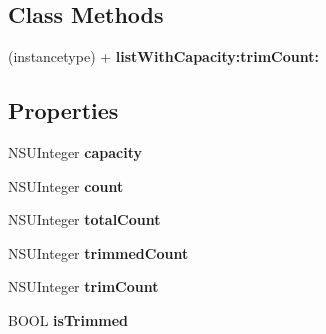 \subsection*{Class Methods}
\begin{DoxyCompactItemize}
\item 
\mbox{\label{interface_l_u_console_log_entry_list_a7004edcb9b66573dd3e6ccdc12ec0c31}} 
(instancetype) + {\bfseries list\+With\+Capacity\+:trim\+Count\+:}
\end{DoxyCompactItemize}
\subsection*{Properties}
\begin{DoxyCompactItemize}
\item 
\mbox{\label{interface_l_u_console_log_entry_list_a08451ca9ca7ccf77d938a5ba81aedc17}} 
N\+S\+U\+Integer {\bfseries capacity}
\item 
\mbox{\label{interface_l_u_console_log_entry_list_a6cc87eb37a5105a719c79ae15bb7cdb8}} 
N\+S\+U\+Integer {\bfseries count}
\item 
\mbox{\label{interface_l_u_console_log_entry_list_af4eeee1c8baef9e856969b6fb7f2d041}} 
N\+S\+U\+Integer {\bfseries total\+Count}
\item 
\mbox{\label{interface_l_u_console_log_entry_list_a64dd4adb87992e04d77aa3a9a6341b98}} 
N\+S\+U\+Integer {\bfseries trimmed\+Count}
\item 
\mbox{\label{interface_l_u_console_log_entry_list_a5ba45295bc04e5a53d8a50361faeb114}} 
N\+S\+U\+Integer {\bfseries trim\+Count}
\item 
\mbox{\label{interface_l_u_console_log_entry_list_a94b78e8b4bec82c2a7ca40c41a97bbef}} 
B\+O\+OL {\bfseries is\+Trimmed}
\item 
\mbox{\label{interface_l_u_console_log_entry_list_abcc09f0bd95dbf58f557f2e4b573ef28}} 

\end{DoxyCompactItemize}
